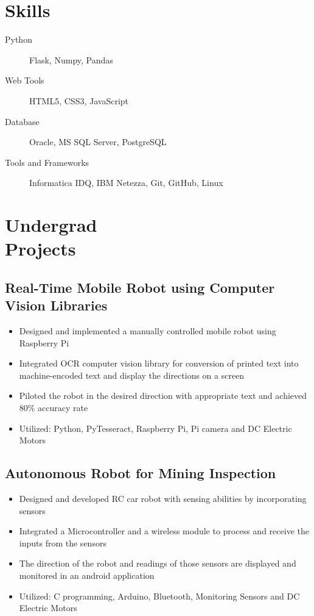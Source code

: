\documentclass{mycv}
\begin{document}
\section{Skills}

\begin{description}
  \item[Python] Flask, Numpy, Pandas
  \item[Web Tools] HTML5, CSS3, JavaScript
  \item[Database] Oracle, MS SQL Server, PostgreSQL
  \item[Tools and Frameworks] Informatica IDQ, IBM Netezza, Git, GitHub, Linux
\end{description}


\section{Undergrad \\ Projects}
\subsection{Real-Time Mobile Robot using Computer Vision Libraries}
\vspace{-\parskip}%
\begin{itemize}
	\item Designed and implemented a manually controlled mobile robot using Raspberry Pi
	\item Integrated OCR computer vision library for conversion of printed text into machine-encoded text and display the directions on a screen
	\item Piloted the robot in the desired direction with appropriate text and achieved 80\% accuracy rate
	\item Utilized: Python, PyTesseract, Raspberry Pi, Pi camera and DC Electric Motors
\end{itemize}

\subsection{Autonomous Robot for Mining Inspection}
\vspace{-\parskip}%
\begin{itemize}
	\item Designed and developed RC car robot with sensing abilities by incorporating sensors
	\item Integrated a Microcontroller and a wireless module to process and receive the inputs from the sensors
	\item The direction of the robot and readings of those sensors are displayed and monitored in an android application
	\item Utilized: C programming, Arduino, Bluetooth, Monitoring Sensors and  DC Electric Motors
\end{itemize}
\end{document}
